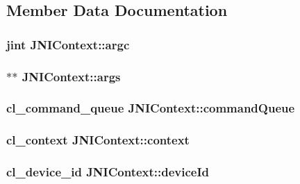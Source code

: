 \subsection{Member Data Documentation}
\hypertarget{class_j_n_i_context_a2a7cb340b07bdc6e1ec3dbee96632747}{
\subsubsection[{argc}]{\setlength{\rightskip}{0pt plus 5cm}jint J\-N\-I\-Context\-::argc}}\label{class_j_n_i_context_a2a7cb340b07bdc6e1ec3dbee96632747}
\hypertarget{class_j_n_i_context_ab0dac9ea15c8025e6da69390ee70622c}{
\subsubsection[{args}]{$\ast$$\ast$ J\-N\-I\-Context\-::args}}\label{class_j_n_i_context_ab0dac9ea15c8025e6da69390ee70622c}
\hypertarget{class_j_n_i_context_af052389a1503633d129ba0a98a8ac94b}{
\subsubsection[{command\-Queue}]{\setlength{\rightskip}{0pt plus 5cm}cl\-\_\-command\-\_\-queue J\-N\-I\-Context\-::command\-Queue}}\label{class_j_n_i_context_af052389a1503633d129ba0a98a8ac94b}
\hypertarget{class_j_n_i_context_ad405fe75428f606a24260f22a30a4914}{
\subsubsection[{context}]{\setlength{\rightskip}{0pt plus 5cm}cl\-\_\-context J\-N\-I\-Context\-::context}}\label{class_j_n_i_context_ad405fe75428f606a24260f22a30a4914}
\hypertarget{class_j_n_i_context_ac9637e5eb4a4de90a76b7a05f1c31882}{
\subsubsection[{device\-Id}]{\setlength{\rightskip}{0pt plus 5cm}cl\-\_\-device\-\_\-id J\-N\-I\-Context\-::device\-Id}}\label{class_j_n_i_context_ac9637e5eb4a4de90a76b7a05f1c31882}
